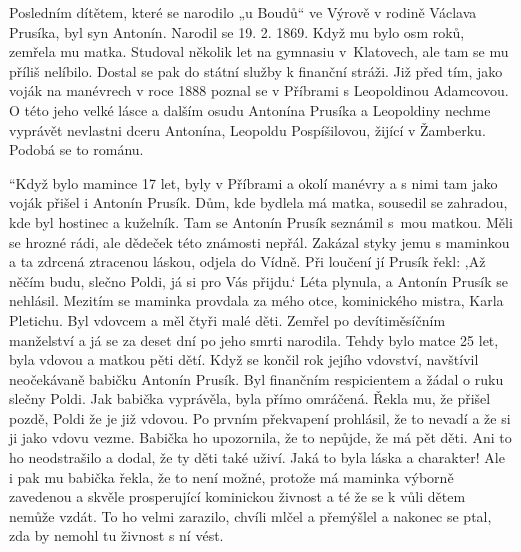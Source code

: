 \documentclass[../dejiny-rodu-prusiku.tex]{subfiles}
\begin{document}
Posledním dítětem, které se narodilo „u Boudů“ ve Výrově v rodině Václava Prusíka, byl syn Antonín. Narodil se 19. 2. 1869. Když mu bylo osm roků, zemřela mu matka. Studoval několik let na gymnasiu v Klatovech, ale tam se mu příliš nelíbilo. Dostal se pak do státní služby k finanční stráži. Již před tím, jako voják na manévrech v roce 1888 poznal se v Příbrami s Leopoldinou Adamcovou. O této jeho velké lásce a dalším osudu Antonína Prusíka a Leopoldiny nechme vyprávět nevlastni dceru Antonína, Leopoldu Pospíšilovou, žijící v Žamberku. Podobá se to románu.

“Když bylo mamince 17 let, byly v Příbrami a okolí manévry a s nimi tam jako voják přišel i Antonín Prusík. Dům, kde bydlela má matka, sousedil se zahradou, kde byl hostinec a kuželník. Tam se Antonín Prusík seznámil s mou matkou. Měli se hrozné rádi, ale dědeček této známosti nepřál. Zakázal styky jemu s maminkou a ta zdrcená ztracenou láskou, odjela do Vídně. Při loučení jí Prusík řekl: ‚Až něčím budu, slečno Poldi, já si pro Vás přijdu.‘ Léta plynula, a Antonín Prusík se nehlásil. Mezitím se maminka provdala za mého otce, kominického mistra, Karla Pletichu. Byl vdovcem a měl čtyři malé děti. Zemřel po devítiměsíčním
manželství a já se za deset dní po jeho smrti narodila. Tehdy bylo matce 25 let, byla vdo­vou a matkou pěti dětí. Když se končil rok jejího vdovství, navštívil neočekávaně babičku Antonín Prusík. Byl finančním respicientem a žádal o ruku slečny Poldi. Jak babička vyprávěla, byla přímo omráčená. Řekla mu, že přišel pozdě, Poldi že je již vdovou. Po prvním překvapení prohlásil, že to nevadí a že si ji jako vdovu vezme. Babička ho upozornila, že to nepůjde, že má pět děti. Ani to ho neodstrašilo a dodal, že ty děti také uživí. Jaká to byla láska a charakter! Ale i pak mu babička řekla, že to není možné, protože má maminka výborně zavedenou a skvěle prosperující kominickou živnost a té že se k vůli dětem nemůže vzdát. To ho velmi zarazilo, chvíli mlčel a přemýšlel a nakonec se ptal, zda by ne­mohl tu živnost s ní vést.
\end{document}

